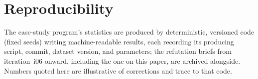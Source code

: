 \documentclass[11pt]{article}
\begin{document}
\section*{Reproducibility}
The case-study program's statistics are produced by deterministic, versioned code (fixed
seeds) writing machine-readable results, each recording its producing script, commit, dataset
version, and parameters; the refutation briefs from iteration~i06 onward, including the one on
this paper, are archived alongside. Numbers quoted here are illustrative of corrections and
trace to that code.



\end{document}
